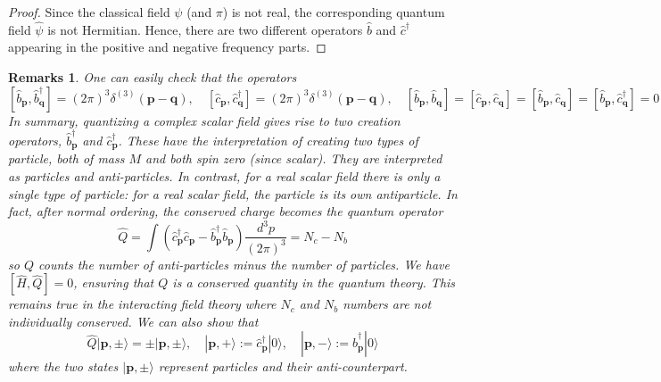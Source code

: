 \documentclass[a4paper]{article}
\newtheorem{remarks}{Remarks}[section]
\theoremstyle{new}
\begin{document}
\begin{proof}
Since the classical field $\psi$ (and $\pi$) is not real, the corresponding quantum field $\hat{\psi}$ is not Hermitian. Hence, there are two different operators $\hat{b}$ and $\hat{c}^\dag$ appearing in the positive and negative frequency parts. 
\end{proof}
\begin{remarks}
One can easily check that the operators $$[\hat{b}_{\mathbf{p}},\hat{b}^\dag_{\mathbf{q}}]=(2\pi)^3\delta^{(3)}(\mathbf{p}-\mathbf{q}),\quad[\hat{c}_{\mathbf{p}},\hat{c}_{\mathbf{q}}^\dag]=(2\pi)^3\delta^{(3)}(\mathbf{p}-\mathbf{q}),\quad[\hat{b}_{\mathbf{p}},\hat{b}_{\mathbf{q}}]=[\hat{c}_{\mathbf{p}},\hat{c}_{\mathbf{q}}]=[\hat{b}_{\mathbf{p}},\hat{c}_{\mathbf{q}}]=[\hat{b}_{\mathbf{p}},\hat{c}^\dag_{\mathbf{q}}]=0$$
In summary, quantizing a complex scalar field gives rise to two creation operators, $\hat{b}^\dag_{\mathbf{p}}$ and $\hat{c}_{\mathbf{p}}^\dag$. These have the interpretation of creating two types of particle, both of mass $M$ and both spin zero (since scalar). They are interpreted as particles and anti-particles. In contrast, for a real scalar field there is only a single type of particle: for a real scalar field, the particle is its own antiparticle. In fact, after normal ordering, the conserved charge becomes the quantum operator
$$\hat{Q}=\int(\hat{c}_{\mathbf{p}}^\dag\hat{c}_{\mathbf{p}}-\hat{b}^\dag_{\mathbf{p}}\hat{b}_{\mathbf{p}})\frac{d^3p}{(2\pi)^3}=N_c-N_b$$
so $Q$ counts the number of anti-particles minus the number of particles. We have $[\hat{H},\hat{Q}]=0$, ensuring that $Q$ is a conserved quantity in the quantum theory. This remains true in the interacting field theory where $N_c$ and $N_b$ numbers are not individually conserved. We can also show that
$$\hat{Q}|\mathbf{p},\pm\rangle=\pm|\mathbf{p},\pm\rangle,\quad|\mathbf{p},+\rangle:=\hat{c}_{\mathbf{p}}^\dag|0\rangle,\quad|\mathbf{p},-\rangle:=\hat{b}_{\mathbf{p}}^\dag|0\rangle$$
where the two states $|\mathbf{p},\pm\rangle$ represent particles and their anti-counterpart.
\end{remarks}
\newpage
\end{document}
